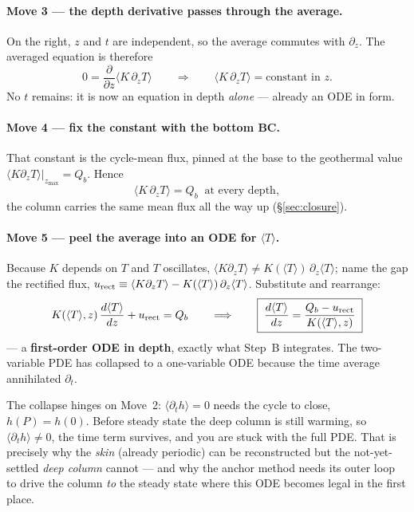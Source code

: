 \documentclass[11pt]{report}
\newcommand{\Tm}{\langle T\rangle}
\begin{document}
\paragraph{Move 3 --- the depth derivative passes through the average.} On the right,
$z$ and $t$ are independent, so the average commutes with $\partial_z$. The averaged
equation is therefore
\[
0=\frac{\partial}{\partial z}\bigl\langle K\,\partial_z T\bigr\rangle
\qquad\Longrightarrow\qquad
\bigl\langle K\,\partial_z T\bigr\rangle=\text{constant in }z.
\]
No $t$ remains: it is now an equation in depth \emph{alone} --- already an ODE in form.

\paragraph{Move 4 --- fix the constant with the bottom BC.} That constant is the
cycle-mean flux, pinned at the base to the geothermal value
$\langle K\partial_z T\rangle|_{z_{\max}}=Q_b$. Hence
\[
\boxed{\;\bigl\langle K\,\partial_z T\bigr\rangle=Q_b\ \text{ at every depth},\;}
\]
the column carries the same mean flux all the way up (\S\ref{sec:closure}).

\paragraph{Move 5 --- peel the average into an ODE for $\Tm$.} Because $K$ depends on
$T$ and $T$ oscillates, $\langle K\partial_z T\rangle\neq K(\Tm)\,\partial_z\Tm$; name
the gap the rectified flux,
$u_{\rm rect}\equiv\langle K\partial_z T\rangle-K(\Tm)\,\partial_z\Tm$. Substitute and
rearrange:
\[
K(\Tm,z)\,\frac{d\Tm}{dz}+u_{\rm rect}=Q_b
\qquad\Longrightarrow\qquad
\boxed{\;\frac{d\Tm}{dz}=\frac{Q_b-u_{\rm rect}}{K(\Tm,z)}\;}
\]
--- a \textbf{first-order ODE in depth}, exactly what Step~B integrates. The
two-variable PDE has collapsed to a one-variable ODE because the time average
annihilated $\partial_t$.

\begin{keypt}[title={Why it is an ODE only in steady state}]
The collapse hinges on Move~2: $\langle\partial_t h\rangle=0$ needs the cycle to close,
$h(P)=h(0)$. Before steady state the deep column is still warming, so
$\langle\partial_t h\rangle\neq0$, the time term survives, and you are stuck with the
full PDE. That is precisely why the \emph{skin} (already periodic) can be reconstructed
but the not-yet-settled \emph{deep column} cannot --- and why the anchor method needs
its outer loop to drive the column \emph{to} the steady state where this ODE becomes
legal in the first place.
\end{keypt}
\end{document}
